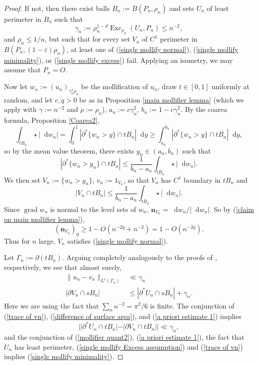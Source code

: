 \documentclass[reqno,11pt]{amsart}
\DeclareMathOperator{\Exc}{Exc}
\newcommand*\dif{\mathop{}\!\mathrm{d}}
\DeclareMathOperator{\grad}{grad}
\newcommand{\normal}{\mathbf n}
\theoremstyle{definition}
\numberwithin{equation}{section}
\begin{document}
\begin{proof}
If not, then there exist balls $B_n := B(P_n, \rho_n)$ and sets $U_n$ of least perimeter in $B_n$ such that
\begin{equation}\label{single mollify Excess assumption}
\gamma_n := \rho_n^{1 - d} \Exc_{\rho_n} (U_n, P_n) \leq n^{-2},
\end{equation}
and $\rho_n \leq 1/n$, but such that for every set $V_n$ of $C^1$ perimeter in $B(P_n, (1 - \varepsilon) \rho_n)$, at least one of (\ref{single mollify normal}), (\ref{single mollify minimality}), or (\ref{single mollify excess}) fail.
Applying an isometry, we may assume that $P_n = O$.

Now let $w_n := (u_n)_{\gamma_n^4 \rho_n}$ be the mollification of $u_n$, draw $t \in [0, 1]$ uniformly at random, and let $c, q > 0$ be as in Proposition \ref{main mollifier lemma} (which we apply with $\gamma := n^{-2}$ and $\rho := \rho_n$), $a_n := c\gamma_n^2$, $b_n := 1 - c\gamma_n^2$.
By the coarea formula, Proposition \ref{Coarea2},
$$\int_{tB_n} \star |\dif w_n| = \int_0^1 |\partial^* \{w_n > y\} \cap tB_n| \dif y \geq \int_{a_n}^{b_n} |\partial^* \{w_n > y\} \cap tB_n| \dif y,$$
so by the mean value theorem, there exists $y_n \in (a_n, b_n)$ such that
$$|\partial^* \{w_n > y_n\} \cap tB_n| \leq \frac{1}{b_n - a_n} \int_{tB_n} \star |\dif w_n|.$$
We then set $V_n := \{w_n > y_n\}$, $v_n := 1_{V_n}$, so that $V_n$ has $C^1$ boundary in $tB_n$ and
\begin{equation}\label{MVT mollifier}
|V_n \cap tB_n| \leq \frac{1}{b_n - a_n} \int_{tB_n} \star |\dif w_n|.
\end{equation}
Since $\grad w_n$ is normal to the level sets of $w_n$, $\normal_{V_n} = \dif w_n/|\dif w_n|$.
So by (\ref{claim on main mollifier lemma}),
$$(\normal_{V_n})_0 \geq 1 - O(n^{-2q} + n^{-2}) = 1 - O(n^{-2q}).$$
Thus for $n$ large, $V_n$ satisfies (\ref{single mollify normal}).

Let $\Gamma_n := \partial(tB_n)$.
Arguing completely analogously to the proofs of \cite[(7.23), (7.22)]{Giusti77}, respectively, we see that almost surely,
\begin{align}
\|u_n - v_n\|_{L^1(\Gamma_n)} &\ll \gamma_n \label{trace of vn} \\
|\partial V_n \cap sB_n| &\leq |\partial^* U_n \cap sB_n| + \gamma_n. \label{difference of surface area}
\end{align}
Here we are using the fact that $\sum_n n^{-2} = \pi^2/6$ is finite.
The conjunction of (\ref{trace of vn}), (\ref{difference of surface area}), and (\ref{a priori estimate 1}) implies
\begin{equation}
||\partial^* U_n \cap tB_n| - |\partial V_n \cap tB_n|| \ll \gamma_n, \label{mollifier quant2}
\end{equation}
and the conjunction of (\ref{mollifier quant2}), (\ref{a priori estimate 1}), the fact that $U_n$ has least perimeter, (\ref{single mollify Excess assumption}) and (\ref{trace of vn}) implies (\ref{single mollify minimality}).


\end{proof}
\end{document}

